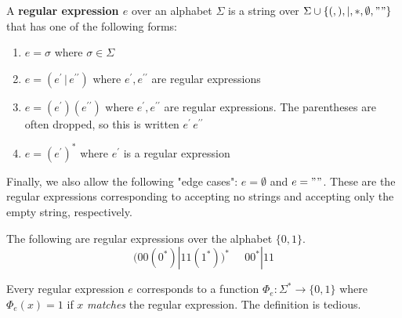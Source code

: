 \documentclass{article}
\begin{document}
  \begin{definition}
  A \textbf{regular expression $e$} over an alphabet $\Sigma$ is a string over $\Sigma \cup \{(, ), |, *, \emptyset, ""\}$ that has one of the following forms: 
  \begin{enumerate}
      \item $e = \sigma$ where $\sigma \in \Sigma$ 
      \item $e = (e^\prime \,|\, e^{\prime\prime})$ where $e^\prime, e^{\prime\prime}$ are regular expressions
      \item $e = (e^\prime)(e^{\prime\prime})$ where $e^\prime, e^{\prime\prime}$ are regular expressions. The parentheses are often dropped, so this is written $e^\prime \, e^{\prime\prime}$
      \item $e = (e^\prime)^*$ where $e^\prime$ is a regular expression
  \end{enumerate}
  Finally, we also allow the following "edge cases": $e = \emptyset$ and $e = ""$. These are the regular expressions corresponding to accepting no strings and accepting only the empty string, respectively. 
  \end{definition}

  \begin{example}
  The following are regular expressions over the alphabet $\{0,1\}$. 
  \[\big( 00(0^*)|11(1^*)\big)^* \;\;\;\;\; 00^*|11\]
  \end{example}

  Every regular expression $e$ corresponds to a function $\Phi_e : \Sigma^* \longrightarrow \{0,1\}$ where $\Phi_e (x) = 1$ if $x$ \textit{matches} the regular expression. The definition is tedious. 
\end{document}

